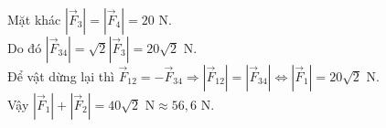 \begin{bt}
{		Mặt khác $\left|\overrightarrow{F}_3\right|=\left|\overrightarrow{F}_4\right|=20\text{ N}$.\\
		Do đó $\left|\overrightarrow{F}_{34}\right|=\sqrt{2}\left|\overrightarrow{F}_3\right|=20\sqrt{2}\text{ N}$.\\ 
		Để vật dừng lại thì $\overrightarrow{F}_{12}=-\overrightarrow{F}_{34}\Rightarrow \left|\overrightarrow{F}_{12}\right|=\left|\overrightarrow{F}_{34}\right|\Leftrightarrow \left| \overrightarrow{F}_1\right|=20\sqrt{2}\text{ N}$.\\
		Vậy $\left| \overrightarrow{F}_1\right|+\left| \overrightarrow{F}_2\right|=40\sqrt{2}\text{ N}\approx 56{,}6\text{ N}$.
	} 
\end{bt}

